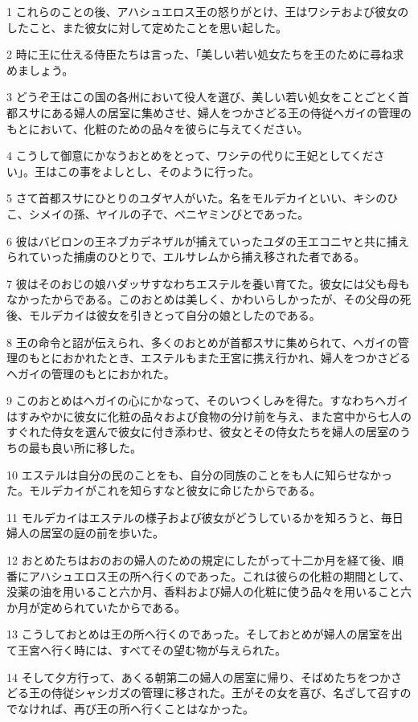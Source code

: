 \par 1 これらのことの後、アハシュエロス王の怒りがとけ、王はワシテおよび彼女のしたこと、また彼女に対して定めたことを思い起した。
\par 2 時に王に仕える侍臣たちは言った、「美しい若い処女たちを王のために尋ね求めましょう。
\par 3 どうぞ王はこの国の各州において役人を選び、美しい若い処女をことごとく首都スサにある婦人の居室に集めさせ、婦人をつかさどる王の侍従ヘガイの管理のもとにおいて、化粧のための品々を彼らに与えてください。
\par 4 こうして御意にかなうおとめをとって、ワシテの代りに王妃としてください」。王はこの事をよしとし、そのように行った。
\par 5 さて首都スサにひとりのユダヤ人がいた。名をモルデカイといい、キシのひこ、シメイの孫、ヤイルの子で、ベニヤミンびとであった。
\par 6 彼はバビロンの王ネブカデネザルが捕えていったユダの王エコニヤと共に捕えられていった捕虜のひとりで、エルサレムから捕え移された者である。
\par 7 彼はそのおじの娘ハダッサすなわちエステルを養い育てた。彼女には父も母もなかったからである。このおとめは美しく、かわいらしかったが、その父母の死後、モルデカイは彼女を引きとって自分の娘としたのである。
\par 8 王の命令と詔が伝えられ、多くのおとめが首都スサに集められて、ヘガイの管理のもとにおかれたとき、エステルもまた王宮に携え行かれ、婦人をつかさどるヘガイの管理のもとにおかれた。
\par 9 このおとめはヘガイの心にかなって、そのいつくしみを得た。すなわちヘガイはすみやかに彼女に化粧の品々および食物の分け前を与え、また宮中から七人のすぐれた侍女を選んで彼女に付き添わせ、彼女とその侍女たちを婦人の居室のうちの最も良い所に移した。
\par 10 エステルは自分の民のことをも、自分の同族のことをも人に知らせなかった。モルデカイがこれを知らすなと彼女に命じたからである。
\par 11 モルデカイはエステルの様子および彼女がどうしているかを知ろうと、毎日婦人の居室の庭の前を歩いた。
\par 12 おとめたちはおのおの婦人のための規定にしたがって十二か月を経て後、順番にアハシュエロス王の所へ行くのであった。これは彼らの化粧の期間として、没薬の油を用いること六か月、香料および婦人の化粧に使う品々を用いること六か月が定められていたからである。
\par 13 こうしておとめは王の所へ行くのであった。そしておとめが婦人の居室を出て王宮へ行く時には、すべてその望む物が与えられた。
\par 14 そして夕方行って、あくる朝第二の婦人の居室に帰り、そばめたちをつかさどる王の侍従シャシガズの管理に移された。王がその女を喜び、名ざして召すのでなければ、再び王の所へ行くことはなかった。
